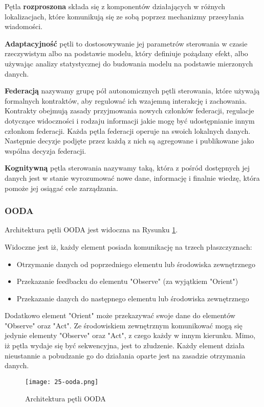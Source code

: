 Pętla \textbf{rozproszona} składa się z komponentów działających w różnych lokalizacjach, które komunikują się ze sobą poprzez mechanizmy przesyłania wiadomości. 

\textbf{Adaptacyjność} pętli to dostosowywanie jej parametrów sterowania w czasie rzeczywistym albo na podstawie modelu, który definiuje pożądany efekt, albo używając analizy statystycznej do budowania modelu na podstawie mierzonych danych.

\textbf{Federacją} nazywamy grupę pół autonomicznych pętli sterowania, które używają formalnych kontraktów, aby regulować ich wzajemną interakcję i zachowania. Kontrakty obejmują zasady przyjmowania nowych członków federacji, regulacje dotyczące widoczności i rodzaju informacji jakie mogę być udostępnianie innym członkom federacji. Każda pętla federacji operuje na swoich lokalnych danych. Następnie decyzje podjęte przez każdą z nich są agregowane i publikowane jako wspólna decyzja federacji.

\textbf{Kognitywną} pętla sterowania nazywamy taką, która z pośród dostępnych jej danych jest w stanie wyrozumować nowe dane, informację i finalnie wiedzę, która pomoże jej osiągać cele zarządzania.

\subsubsection{OODA}
Architektura pętli OODA \cite{boyd1995} jest widoczna na Rysunku \ref{fig:25-ooda}.

Widoczne jest iż, każdy element posiada komunikację na trzech płaszczyznach:
\begin{itemize}
    \item Otrzymanie danych od poprzedniego elementu lub środowiska zewnętrznego
    \item Przekazanie feedbacku do elementu "Observe" (za wyjątkiem "Orient")
    \item Przekazanie danych do następnego elementu lub środowiska zewnętrznego
\end{itemize}

Dodatkowo element "Orient" może przekazywać swoje dane do elementów "Observe" oraz "Act". Ze środowiskiem zewnętrznym komunikować mogą się jedynie elementy "Observe" oraz "Act", z czego każdy w innym kierunku. Mimo, iż pętla wydaje się być sekwencyjna, jest to złudzenie. Każdy element działa nieustannie a pobudzanie go do działania oparte jest na zasadzie otrzymania danych.


\begin{figure}[!h]
    \centering \texttt{[image: 25-ooda.png]}
    \caption{Architektura pętli OODA}\label{fig:25-ooda}
\end{figure}

